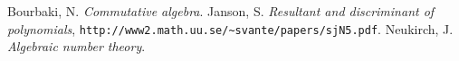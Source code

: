 \documentclass{article}
\numberwithin{definition}{subsection}
\begin{document}
\begin{thebibliography}{9}
   Bourbaki, N. \emph{Commutative algebra}. 
   Janson, S. \emph{Resultant and discriminant of polynomials}, 
    \texttt{http://www2.math.uu.se/\~{}svante/papers/sjN5.pdf}. 
   Neukirch, J. \emph{Algebraic number theory}. 
\end{thebibliography}
\end{document}

